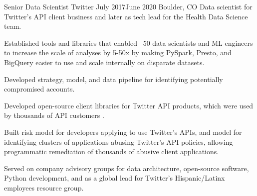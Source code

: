 \documentclass[print]{ag-cv} %
\begin{document}
\begin{job}
  {Senior Data Scientist}
  {Twitter}
  {July 2017}{June 2020}
  {Boulder, CO}
  {
  Data scientist for Twitter's API client business and later as tech lead for the Health Data Science team. 
  }
{
    \begin{myitemize}
      \item Established tools and libraries that enabled ~50 data scientists and
      ML engineers to increase the scale of analyses by 5-50x by making PySpark,
      Presto, and BigQuery easier to use and scale internally on disparate
      datasets.
      
      \item Developed strategy, model, and data pipeline for identifying
      potentially compromised accounts.
      
      \item Developed open-source client libraries for Twitter API products, which
      were used by thousands of API customers
      \autocite{search_tweets_python,do_more_with_twitter_data}.
      
      \item Built risk model for developers applying to use Twitter's APIs, and
      model for identifying clusters of applications abusing Twitter's API
      policies, allowing programmatic remediation of thousands of abusive client
      applications.
      
      \item Served on company advisory groups for data architecture, open-source
      software, Python development, and as a global lead for Twitter's
      Hispanic/Latinx employees resource group.
    \end{myitemize}
    } 

\end{job}
\end{document}
